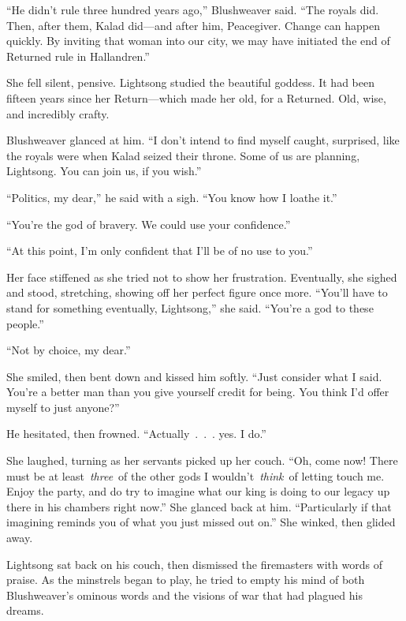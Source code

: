 “He didn’t rule three hundred years ago,” Blushweaver said. “The royals did. Then, after them, Kalad did—and after him, Peacegiver. Change can happen quickly. By inviting that woman into our city, we may have initiated the end of Returned rule in Hallandren.”

She fell silent, pensive. Lightsong studied the beautiful goddess. It had been fifteen years since her Return—which made her old, for a Returned. Old, wise, and incredibly crafty.

Blushweaver glanced at him. “I don’t intend to find myself caught, surprised, like the royals were when Kalad seized their throne. Some of us are planning, Lightsong. You can join us, if you wish.”

“Politics, my dear,” he said with a sigh. “You know how I loathe it.”

“You’re the god of bravery. We could use your confidence.”

“At this point, I’m only confident that I’ll be of no use to you.”

Her face stiffened as she tried not to show her frustration. Eventually, she sighed and stood, stretching, showing off her perfect figure once more. “You’ll have to stand for something eventually, Lightsong,” she said. “You’re a god to these people.”

“Not by choice, my dear.”

She smiled, then bent down and kissed him softly. “Just consider what I said. You’re a better man than you give yourself credit for being. You think I’d offer myself to just anyone?”

He hesitated, then frowned. “Actually~.~.~. yes. I do.”

She laughed, turning as her servants picked up her couch. “Oh, come now! There must be at least~\textit{three}~of the other gods I wouldn’t~\textit{think}~of letting touch me. Enjoy the party, and do try to imagine what our king is doing to our legacy up there in his chambers right now.” She glanced back at him. “Particularly if that imagining reminds you of what you just missed out on.” She winked, then glided away.

Lightsong sat back on his couch, then dismissed the firemasters with words of praise. As the minstrels began to play, he tried to empty his mind of both Blushweaver’s ominous words and the visions of war that had plagued his dreams.

